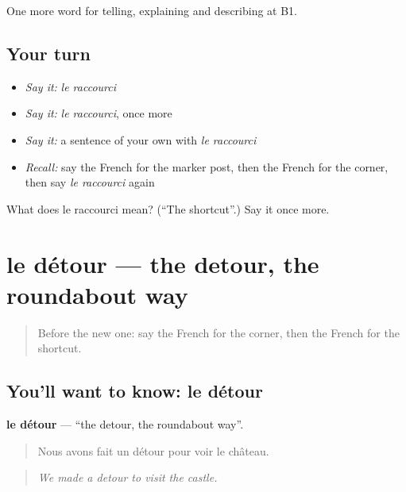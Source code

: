 \begin{grammarlens}[title={What you've built}]
One more word for telling, explaining and describing at B1.
\end{grammarlens}

\subsection*{Your turn}
\begin{itemize}
\raggedright
  \item \emph{Say it:} \emph{le raccourci}
  \item \emph{Say it:} \emph{le raccourci}, once more
  \item \emph{Say it:} a sentence of your own with \emph{le raccourci}
  \item \emph{Recall:} say the French for the marker post, then the French for the corner, then say \emph{le raccourci} again
\end{itemize}

\begin{tcolorbox}[breakable,colback=teal!4,colframe=teal!35!black,title={Before you move on}]
What does le raccourci mean? (\textquotedblleft{}The shortcut\textquotedblright{}.) Say it once more.
\end{tcolorbox}
\section[le détour]{le détour — the detour, the roundabout way}

\label{lesson:FR-C436-detour}



\begin{quote}
Before the new one: say the French for the corner, then the French for the shortcut.
\end{quote}

\subsection*{You'll want to know: le détour}
\textbf{le détour} — \textquotedblleft{}the detour, the roundabout way\textquotedblright{}.

\begin{quote}
Nous avons fait un détour pour voir le château.
\end{quote}

\begin{quote}
\emph{We made a detour to visit the castle.}
\end{quote}

